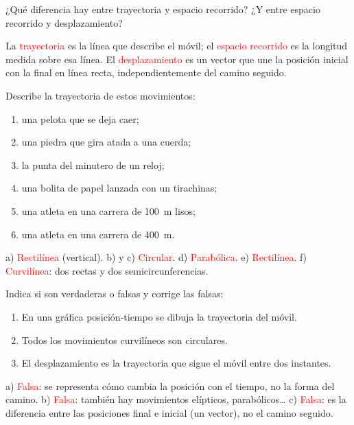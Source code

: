 \begin{exercise}
    ¿Qué diferencia hay entre trayectoria y espacio recorrido? ¿Y entre espacio recorrido y desplazamiento?
    \begin{solu}
        La \textcolor{red}{trayectoria} es la línea que describe el móvil; el \textcolor{red}{espacio recorrido} es la longitud medida sobre esa línea. El \textcolor{red}{desplazamiento} es un vector que une la posición inicial con la final en línea recta, independientemente del camino seguido.
    \end{solu}
\end{exercise}

\begin{exercise}
    Describe la trayectoria de estos movimientos:
    \begin{enumerate}[label=\alph*)]
        \item una pelota que se deja caer;
        \item una piedra que gira atada a una cuerda;
        \item la punta del minutero de un reloj;
        \item una bolita de papel lanzada con un tirachinas;
        \item una atleta en una carrera de \qty{100}{\m} lisos;
        \item una atleta en una carrera de \qty{400}{\m}.
    \end{enumerate}
    \begin{solu}
        a) \textcolor{red}{Rectilínea} (vertical). b) y c) \textcolor{red}{Circular}. d) \textcolor{red}{Parabólica}. e) \textcolor{red}{Rectilínea}. f) \textcolor{red}{Curvilínea}: dos rectas y dos semicircunferencias.
    \end{solu}
\end{exercise}

\begin{exercise}
    Indica si son verdaderas o falsas y corrige las falsas:
    \begin{enumerate}[label=\alph*)]
        \item En una gráfica posición-tiempo se dibuja la trayectoria del móvil.
        \item Todos los movimientos curvilíneos son circulares.
        \item El desplazamiento es la trayectoria que sigue el móvil entre dos instantes.
    \end{enumerate}
    \begin{solu}
        a) \textcolor{red}{Falsa}: se representa cómo cambia la posición con el tiempo, no la forma del camino. b) \textcolor{red}{Falsa}: también hay movimientos elípticos, parabólicos\ldots{} c) \textcolor{red}{Falsa}: es la diferencia entre las posiciones final e inicial (un vector), no el camino seguido.
    \end{solu}
\end{exercise}

